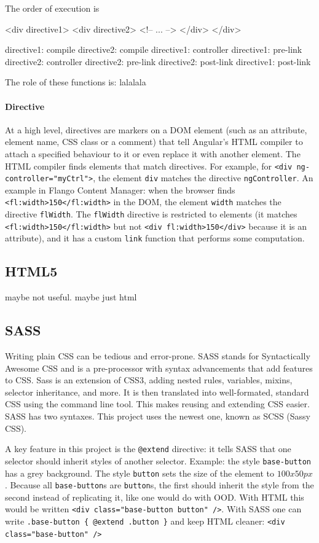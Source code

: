 The order of execution is

<div directive1>
  <div directive2>
    <!-- ... -->
  </div>
</div>

directive1: compile
  directive2: compile
directive1: controller
directive1: pre-link
  directive2: controller
  directive2: pre-link
  directive2: post-link
directive1: post-link

The role of these functions is:
lalalala


\paragraph{Directive} At a high level, directives are markers on a \ac{DOM} element (such as an attribute, element name, \ac{CSS} class or a comment) that tell Angular's \ac{HTML} compiler to attach a specified behaviour to it or even replace it with another element.
The \ac{HTML} compiler finds elements that match directives. 
For example, for \lstinline$<div ng-controller="myCtrl">$, the element \texttt{div} matches the directive \texttt{ngController}.
An example in Flango Content Manager: when the browser finds \lstinline$<fl:width>150</fl:width>$ in the \ac{DOM}, the element \texttt{width} matches the directive \texttt{flWidth}.
The \texttt{flWidth} directive is restricted to elements (it matches \lstinline$<fl:width>150</fl:width>$ but not \lstinline$<div fl:width>150</div>$ because it is an attribute), and it has a custom \texttt{link} function that performs some computation.

    
\subsection{HTML5}
maybe not useful. maybe just html

\subsection{SASS}
Writing plain \ac{CSS} can be tedious and error-prone.
SASS stands for Syntactically Awesome CSS and is a pre-processor with syntax advancements that add features to \ac{CSS}.
Sass is an extension of \ac{CSS}3, adding nested rules, variables, mixins, selector inheritance, and more.
It is then translated into well-formated, standard \ac{CSS} using the command line tool.
This makes reusing and extending \ac{CSS} easier.
SASS has two syntaxes. This project uses the newest one, known as \ac{SCSS} (Sassy CSS).

A key feature in this project is the \lstinline$@extend$ directive: it tells \ac{SASS} that one selector should inherit styles of another selector.
Example: the style \texttt{base-button} has a grey background. The style \texttt{button} sets the size of the element to $100 x 50 px$.
Because all \texttt{base-button}s are \texttt{button}s, the first should inherit the style from the second instead of replicating it, like one would do with \ac{OOD}.
With \ac{HTML} this would be written \lstinline$<div class="base-button button" />$.
With SASS one can write \lstinline$.base-button { @extend .button }$ and keep \ac{HTML} cleaner: \lstinline$<div class="base-button" />$

